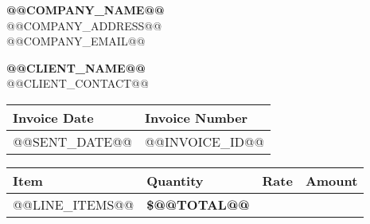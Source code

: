 \documentclass[11pt]{article}
\begin{document}
    \renewcommand{\arraystretch}{1.3}

    \begin{center}
    {\Huge \textbf{@@COMPANY_NAME@@}} \\
    \vspace{0.2cm}
    @@COMPANY_ADDRESS@@\\
    @@COMPANY_EMAIL@@
    \end{center}

    \vspace{1cm}

    \noindent
    \begin{minipage}{0.45\linewidth}
        \textbf{@@CLIENT_NAME@@} \\
        @@CLIENT_CONTACT@@  \\
    \end{minipage}
    \hfill
    \begin{minipage}{0.45\linewidth}
        \raggedleft
        \begin{tabular}{| C{3cm} | C{3cm} |}
            \hline
            \textbf{Invoice Date} & \textbf{Invoice Number} \\
            \hline
            @@SENT_DATE@@ & @@INVOICE_ID@@ \\
            \hline
        \end{tabular}
    \end{minipage}

    \vspace{1cm}

    \noindent
        \begin{tabularx}{\textwidth}{| X | R{1.5cm} | R{1.5cm} | R{2cm} |}
        \hline
            \textbf{Item} & \textbf{Quantity} & \textbf{Rate} & \textbf{Amount} \\
            \hline
            @@LINE_ITEMS@@
             &   \textbf{\$@@TOTAL@@} \\
        \end{tabularx}
\end{document}
